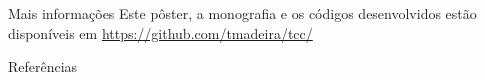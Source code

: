 \documentclass{beamer}
\begin{document}
\begin{frame}
\begin{columns}[t]
\begin{column}{0.5\textwidth}
  \begin{block}{Mais informações}
    Este pôster, a monografia e os códigos desenvolvidos estão disponíveis em \url{https://github.com/tmadeira/tcc/}
  \end{block}

  \begin{block}{Referências}
    {\scriptsize
    
    
    }
  \end{block}
\end{column}
\end{columns}
\end{frame}
\end{document}
